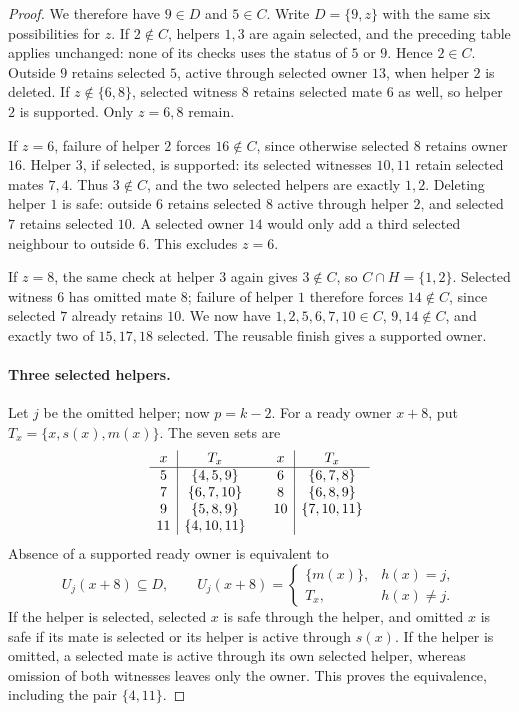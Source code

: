 \begin{proof}
We therefore have $9\in D$ and $5\in C$. Write $D=\{9,z\}$ with the same
six possibilities for $z$. If $2\notin C$, helpers $1,3$ are again selected,
and the preceding table applies unchanged: none of its checks uses the status
of $5$ or $9$. Hence $2\in C$. Outside $9$ retains selected $5$, active
through selected owner $13$, when helper $2$ is deleted. If
$z\notin\{6,8\}$, selected witness $8$ retains selected mate $6$ as well,
so helper $2$ is supported. Only $z=6,8$ remain.

If $z=6$, failure of helper $2$ forces $16\notin C$, since otherwise
selected $8$ retains owner $16$. Helper $3$, if selected, is supported:
its selected witnesses $10,11$ retain selected mates $7,4$.
Thus $3\notin C$, and the two selected helpers are exactly $1,2$.
Deleting helper $1$ is safe: outside $6$ retains selected $8$ active through
helper $2$, and selected $7$ retains selected $10$. A selected owner $14$
would only add a third selected neighbour to outside $6$.
This excludes $z=6$.

If $z=8$, the same check at helper $3$ again gives $3\notin C$, so
$C\cap H=\{1,2\}$. Selected witness $6$ has omitted mate $8$; failure
of helper $1$ therefore forces $14\notin C$, since selected $7$ already
retains $10$. We now have $1,2,5,6,7,10\in C$, $9,14\notin C$, and exactly
two of $15,17,18$ selected. The reusable finish gives a supported owner.

\paragraph{Three selected helpers.}
Let $j$ be the omitted helper; now $p=k-2$. For a ready owner $x+8$, put
$T_x=\{x,s(x),m(x)\}$. The seven sets are
\[
\begin{array}{c|c@{\qquad}c|c}
x&T_x&x&T_x\\\hline
5&\{4,5,9\}&6&\{6,7,8\}\\
7&\{6,7,10\}&8&\{6,8,9\}\\
9&\{5,8,9\}&10&\{7,10,11\}\\
11&\{4,10,11\}&&
\end{array}
\]
Absence of a supported ready owner is equivalent to
\begin{equation}\label{eq:twenty-obstruction}
 U_j(x+8)\subseteq D,\qquad
 U_j(x+8)=\begin{cases}\{m(x)\},&h(x)=j,\\T_x,&h(x)\ne j.\end{cases}
\end{equation}
If the helper is selected, selected $x$ is safe through the helper, and
omitted $x$ is safe if its mate is selected or its helper is active through
$s(x)$. If the helper is omitted, a selected mate is active through its own
selected helper, whereas omission of both witnesses leaves only the owner.
This proves the equivalence, including the pair $\{4,11\}$.


\end{proof}
